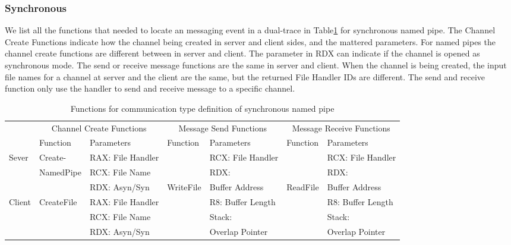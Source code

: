 \subsubsection{Synchronous}
We list all the functions that needed to locate an messaging event in a dual-trace in Table\ref{synfunctions} for synchronous named pipe. The Channel Create Functions indicate how the channel being created in server and client sides, and the mattered parameters. For named pipes the channel create functions are different between in server and client. The parameter in RDX can indicate if the channel is opened as synchronous mode. The send or receive message functions are the same in server and client. When the channel is being created, the input file names for a channel at server and the client are the same, but the returned File Handler IDs are different. The send and receive function only use the handler to send and receive message to a specific channel. 
\begin{table}[h]
        \centering
        \caption{Functions for communication type definition of synchronous named pipe}
        \label{synfunctions}
        \begin{tabular}{|l|l|l|l|l|l|l|}
            \hline
             \multirow{2}{*}{} &
               \multicolumn{2}{c|}{Channel Create Functions} &
               \multicolumn{2}{c|}{Message Send Functions} &
               \multicolumn{2}{c|}{Message Receive Functions} \\
             \cline{2-7}
              & Function& Parameters & Function & Parameters  & Function & Parameters\\
             \hline
             Sever& Create-&  RAX: File Handler &  &  RCX: File Handler &&RCX: File Handler\\
             \cline{3-3} \cline{5-5} \cline{7-7}
             &NamedPipe&RCX: File Name && RDX:  &&RDX: \\
              \cline{3-3} 
             &&RDX: Asyn/Syn&WriteFile & Buffer Address &ReadFile&Buffer Address\\
                \cline{1-3} \cline{5-5} \cline{7-7}
             Client & CreateFile & RAX: File Handler & &  R8: Buffer Length &&R8: Buffer Length\\
              \cline{3-3} \cline{5-5} \cline{7-7}
             &&RCX: File Name &&Stack:&&Stack:\\
             \cline{3-3} 
             &&RDX: Asyn/Syn&& Overlap Pointer&&Overlap Pointer\\
            \hline
        \end{tabular}
    \end{table}

